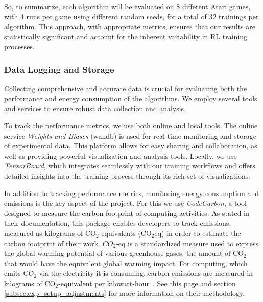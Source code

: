 So, to summarize, each algorithm will be evaluated on 8 different Atari games, with 4 runs per game using different random seeds, for a total of 32 trainings per algorithm. This approach, with appropriate metrics, ensures that our results are statistically significant and account for the inherent variability in RL training processes.

\subsubsection{Data Logging and Storage}
\label{subsubsec:data_collection}

Collecting comprehensive and accurate data is crucial for evaluating both the performance and energy consumption of the algorithms. We employ several tools and services to ensure robust data collection and analysis.

To track the performance metrics, we use both online and local tools. The online service \textit{Weights and Biases} (wandb) is used for real-time monitoring and storage of experimental data. This platform allows for easy sharing and collaboration, as well as providing powerful visualization and analysis tools. Locally, we use \textit{TensorBoard}, which integrates seamlessly with our training workflows and offers detailed insights into the training process through its rich set of visualizations.

In addition to tracking performance metrics, monitoring energy consumption and emissions is the key aspect of the project. For this we use \textit{CodeCarbon}, a tool designed to measure the carbon footprint of computing activities. As stated in their documentation, this package enables developers to track emissions, measured as kilograms of \mbox{$\text{CO}_2$-equivalents} ($\text{CO}_2$eq) in order to estimate the carbon footprint of their work. \mbox{$CO_2$-eq} is a standardized measure used to express the global warming potential of various greenhouse gases: the amount of $\text{CO}_2$ that would have the equivalent global warming impact. For computing, which emits $\text{CO}_2$ via the electricity it is consuming, carbon emissions are measured in kilograms of $\text{CO}_2$-equivalent per kilowatt-hour~\cite{benoit:code_carbon}. See \href{https://mlco2.github.io/codecarbon/methodology.html}{this} page and section \ref{subsec:exp_setup_adjustments} for more information on their methodology.

